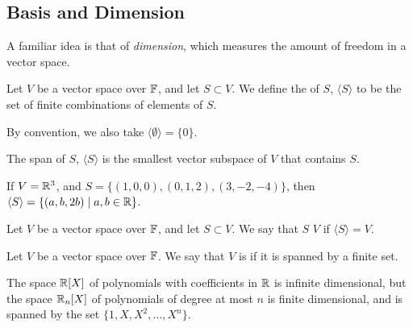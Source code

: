 \documentclass[a4paper]{scrartcl}
\begin{document}
\subsection{Basis and Dimension}

A familiar idea is that of \emph{dimension}, which measures the amount of freedom in a vector space.

\begin{definition}[Span]
    Let $V$ be a vector space over $\mathbb{F}$, and let $S \subset V$. We define the  of $S$, $\langle S \rangle$ to be the set of finite combinations of elements of $S$.
\end{definition}

\begin{remark}
    By convention, we also take $\langle \emptyset \rangle = \{ 0\}$.
\end{remark}

    The span of $S$, $\langle S \rangle$ is the smallest vector subspace of $V$ that contains $S$.


\begin{example}
    If $V = \mathbb{R}^3$, and $S = \{(1, 0, 0), (0, 1, 2), (3, -2, -4)\}$, then $\langle S \rangle = \{(a, b, 2b) \mid a, b \in \mathbb{R}\}$.
\end{example}


\begin{definition}
    Let $V$ be a vector space over $\mathbb{F}$, and let $S \subset V$. We say that $S$  $V$ if $\langle S \rangle = V$.
\end{definition}

\begin{definition}
    Let $V$ be a vector space over $\mathbb{F}$. We say that $V$ is  if it is spanned by a finite set.
\end{definition}

\begin{example}
    The space $\mathbb{R}[X]$ of polynomials with coefficients in $\mathbb{R}$ is infinite dimensional, but the space $\mathbb{R}_n[X]$ of polynomials of degree at most $n$ is finite dimensional, and is spanned by the set $\{1, X, X^2, \dots, X^n\}$.
\end{example}
\end{document}
